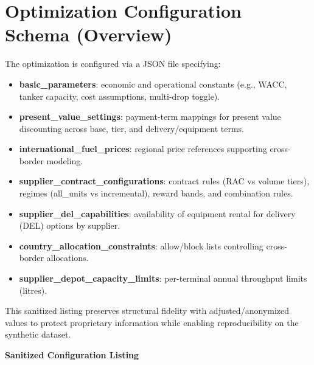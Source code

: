 
\section*{Optimization Configuration Schema (Overview)}
The optimization is configured via a JSON file specifying:
\begin{itemize}
  \item \textbf{basic\_parameters}: economic and operational constants (e.g., WACC, tanker capacity, cost assumptions, multi-drop toggle).
  \item \textbf{present\_value\_settings}: payment-term mappings for present value discounting across base, tier, and delivery/equipment terms.
  \item \textbf{international\_fuel\_prices}: regional price references supporting cross-border modeling.
  \item \textbf{supplier\_contract\_configurations}: contract rules (RAC vs volume tiers), regimes (all\_units vs incremental), reward bands, and combination rules.
  \item \textbf{supplier\_del\_capabilities}: availability of equipment rental for delivery (DEL) options by supplier.
  \item \textbf{country\_allocation\_constraints}: allow/block lists controlling cross-border allocations.
  \item \textbf{supplier\_depot\_capacity\_limits}: per-terminal annual throughput limits (litres).
\end{itemize}
This sanitized listing preserves structural fidelity with adjusted/anonymized values to protect proprietary information while enabling reproducibility on the synthetic dataset.

\vspace{0.5em}
\noindent\textbf{Sanitized Configuration Listing}

\lstset{basicstyle=\ttfamily\footnotesize, breaklines=true}


